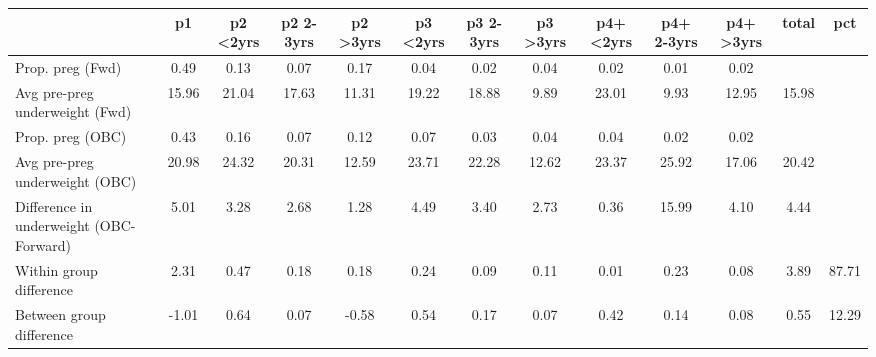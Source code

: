 \begin{tabular}{l*{12}{c}}
\toprule
            &\multicolumn{1}{c}{p1}&\multicolumn{1}{c}{p2 \textless2yrs}&\multicolumn{1}{c}{p2 2-3yrs}&\multicolumn{1}{c}{p2 \textgreater3yrs}&\multicolumn{1}{c}{p3 \textless2yrs}&\multicolumn{1}{c}{p3 2-3yrs}&\multicolumn{1}{c}{p3 \textgreater3yrs}&\multicolumn{1}{c}{p4+ \textless2yrs}&\multicolumn{1}{c}{p4+ 2-3yrs}&\multicolumn{1}{c}{p4+ \textgreater3yrs}&\multicolumn{1}{c}{total}&\multicolumn{1}{c}{pct}\\
\midrule
\midrule
Prop. preg (Fwd)&        0.49&        0.13&        0.07&        0.17&        0.04&        0.02&        0.04&        0.02&        0.01&        0.02&            &            \\
Avg pre-preg underweight (Fwd)&       15.96&       21.04&       17.63&       11.31&       19.22&       18.88&        9.89&       23.01&        9.93&       12.95&       15.98&            \\
Prop. preg (OBC)&        0.43&        0.16&        0.07&        0.12&        0.07&        0.03&        0.04&        0.04&        0.02&        0.02&            &            \\
Avg pre-preg underweight (OBC)&       20.98&       24.32&       20.31&       12.59&       23.71&       22.28&       12.62&       23.37&       25.92&       17.06&       20.42&            \\
Difference in underweight (OBC-Forward)&        5.01&        3.28&        2.68&        1.28&        4.49&        3.40&        2.73&        0.36&       15.99&        4.10&        4.44&            \\
Within group difference&        2.31&        0.47&        0.18&        0.18&        0.24&        0.09&        0.11&        0.01&        0.23&        0.08&        3.89&       87.71\\
Between group difference&       -1.01&        0.64&        0.07&       -0.58&        0.54&        0.17&        0.07&        0.42&        0.14&        0.08&        0.55&       12.29\\
\bottomrule
\end{tabular}
